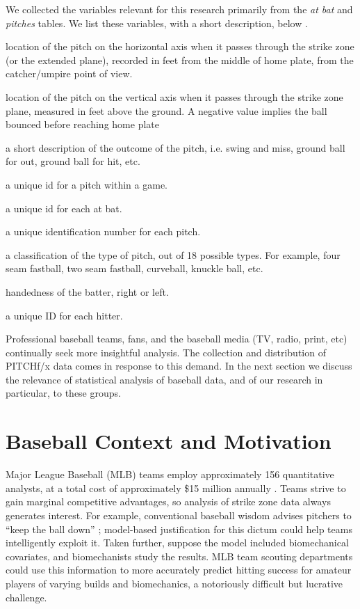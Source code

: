 We collected the variables relevant for this research primarily from the {\it at bat} and {\it pitches} tables. We list these variables, with a short description, below \citep{Fast2007}.
  \begin{description}[leftmargin=1.5cm, style=nextline]
  \item[px] location of the pitch on the horizontal axis when it passes through the strike zone (or the extended plane), recorded in feet from the middle of home plate, from the catcher/umpire point of view.
  \item[pz] location of the pitch on the vertical axis when it passes through the strike zone plane, measured in feet above the ground. A negative value implies the ball bounced before reaching home plate
  \item[des] a short description of the outcome of the pitch, i.e. swing and miss, ground ball for out, ground ball for hit, etc.
  \item[id] a unique id for a pitch within a game.
  \item[ab\_id] a unique id for each at bat.
  \item[pitch\_id] a unique identification number for each pitch.
  \item[pitch\_type] a classification of the type of pitch, out of 18 possible types. For example, four seam fastball, two seam fastball, curveball, knuckle ball, etc.
  \item[stand] handedness of the batter, right or left.
  \item[batter] a unique ID for each hitter.
\end{description}

Professional baseball teams, fans, and the baseball media (TV, radio, print, etc)  continually seek more insightful analysis. The collection and distribution of PITCHf/x\textsuperscript{\textregistered} data comes in response to this demand. In the next section we discuss the relevance of statistical analysis of baseball data, and of our research in particular, to these groups.

\section{Baseball Context and Motivation}

Major League Baseball (MLB\textsuperscript{\textregistered}) teams employ approximately 156 quantitative analysts, at a total cost of approximately \$15 million annually \citep{Lindbergh2016}. Teams strive to gain marginal competitive advantages, so analysis of strike zone data always generates interest. For example, conventional baseball wisdom advises pitchers to ``keep the ball down'' \citep{Stallings2003}; model-based justification for this dictum could help teams intelligently exploit it. Taken further, suppose the model included biomechanical covariates, and biomechanists study the results. MLB\textsuperscript{\textregistered} team scouting departments could use this information to more accurately predict hitting success for amateur players of varying builds and biomechanics, a notoriously difficult but lucrative challenge. 

